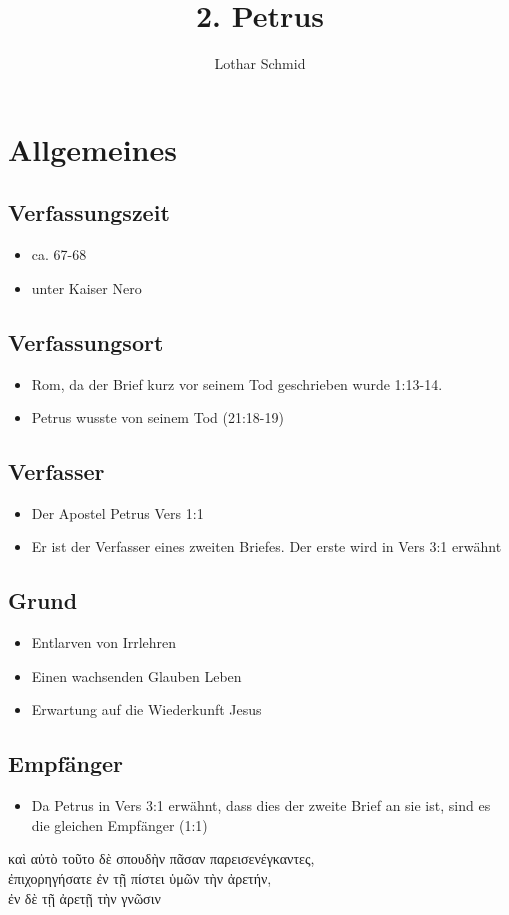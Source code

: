 \documentclass[12pt]{mybibreport}
\title{2. Petrus}
\author{Lothar Schmid}
\date{}
\begin{document}
\tableofcontents


\chapter{Allgemeines}
\section{Verfassungszeit}
\begin{itemize}
    \item ca. 67-68 \nChr
    \item unter Kaiser Nero
\end{itemize}
\section{Verfassungsort}
\begin{itemize}
    \item Rom, da der Brief kurz vor seinem Tod geschrieben wurde 1:13-14.
    \item Petrus wusste von seinem Tod (21:18-19)
\end{itemize}
\section{Verfasser}
\begin{itemize}
    \item Der Apostel Petrus Vers 1:1
    \item Er ist der Verfasser eines zweiten Briefes. Der erste wird in Vers 3:1 erwähnt
\end{itemize}
\section{Grund}
\begin{itemize}
    \item Entlarven von Irrlehren
    \item Einen wachsenden Glauben Leben
    \item Erwartung auf die Wiederkunft Jesus
\end{itemize}
\section{Empfänger}
\begin{itemize}
    \item Da Petrus in Vers 3:1 erwähnt, dass dies der zweite Brief an sie ist, sind es die gleichen Empfänger (1:1)
\end{itemize}
\textgreek{
    καὶ αὐτὸ τοῦτο δὲ σπουδὴν πᾶσαν παρεισενέγκαντες,\\
    ἐπιχορηγήσατε ἐν τῇ πίστει ὑμῶν τὴν ἀρετήν,\\
    ἐν δὲ τῇ ἀρετῇ τὴν γνῶσιν
}
\end{document}
